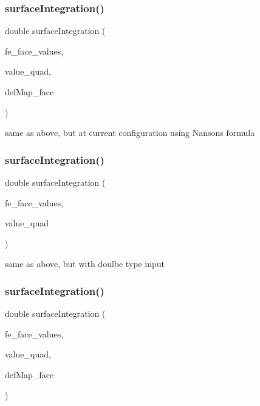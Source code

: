 \subsubsection{\texorpdfstring{surfaceIntegration()}{surfaceIntegration()}\hspace{0.1cm}{\footnotesize\ttfamily [4/6]}}
{\footnotesize\ttfamily double surface\+Integration (\begin{DoxyParamCaption}\item[{const F\+E\+Face\+Values$<$ dim $>$ \&}]{fe\+\_\+face\+\_\+values,  }\item[{dealii\+::\+Table$<$ 1, Sacado\+::\+Fad\+::\+D\+Fad$<$ double $>$ $>$ \&}]{value\+\_\+quad,  }\item[{\mbox{\hyperlink{structdeformation_map}{deformation\+Map}}$<$ T, dim $>$ \&}]{def\+Map\+\_\+face }\end{DoxyParamCaption})}

same as above, but at current configuration using Nanson\textquotesingle{}s formula \mbox{\label{class_residual_a454c4fd90cd46e3108e3d76eccbf2075}} 
\subsubsection{\texorpdfstring{surfaceIntegration()}{surfaceIntegration()}\hspace{0.1cm}{\footnotesize\ttfamily [5/6]}}
{\footnotesize\ttfamily double surface\+Integration (\begin{DoxyParamCaption}\item[{const F\+E\+Face\+Values$<$ dim $>$ \&}]{fe\+\_\+face\+\_\+values,  }\item[{dealii\+::\+Table$<$ 1, double $>$ \&}]{value\+\_\+quad }\end{DoxyParamCaption})}

same as above, but with doulbe type input \mbox{\label{class_residual_a8c32782b660888461d7b8f8a728b2751}} 
\subsubsection{\texorpdfstring{surfaceIntegration()}{surfaceIntegration()}\hspace{0.1cm}{\footnotesize\ttfamily [6/6]}}
{\footnotesize\ttfamily double surface\+Integration (\begin{DoxyParamCaption}\item[{const F\+E\+Face\+Values$<$ dim $>$ \&}]{fe\+\_\+face\+\_\+values,  }\item[{dealii\+::\+Table$<$ 1, double $>$ \&}]{value\+\_\+quad,  }\item[{\mbox{\hyperlink{structdeformation_map}{deformation\+Map}}$<$ T, dim $>$ \&}]{def\+Map\+\_\+face }\end{DoxyParamCaption})}

